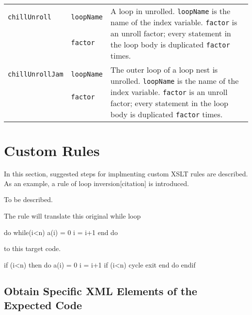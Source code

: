 \begin{longtable}[l]{l|l|l}
\texttt{chillUnroll} & \texttt{loopName}  & \multirow{3}{9cm}{A loop in
 unrolled. \texttt{loopName} is the name of the index
 variable. \texttt{factor} is an unroll factor; every
 statement in the loop body is duplicated \texttt{factor} times.} \\ &
 \texttt{factor} & \\ &&\\ \hline

\texttt{chillUnrollJam} & \texttt{loopName} & \multirow{4}{9cm}{The outer
 loop of a loop nest is unrolled. \texttt{loopName} is the name of the
 index variable. \texttt{factor} is an unroll factor; every statement in
 the loop body is duplicated \texttt{factor} times.} \\ &
 \texttt{factor} & \\ &&\\ &&\\  \hline
\end{longtable}

\section{Custom Rules}\label{sec:custom}

In this section, suggested steps for implmenting custom XSLT rules are described.
As an example, a rule of loop inversion[citation] is introduced.

To be described.

\iffalse

The rule will translate this original while loop
\begin{framed}
\begin{src}
    do while(i<n)
        a(i) = 0
        i = i+1
    end do
\end{src}
\end{framed}

to this target code.

\begin{framed}
\begin{src}
    if (i<n) then
        do
            a(i) = 0
            i = i+1
            if  (i<n)  cycle
            exit
        end do
    endif
\end{src}
\end{framed}



\subsection{Obtain Specific XML Elements of the Expected Code}

